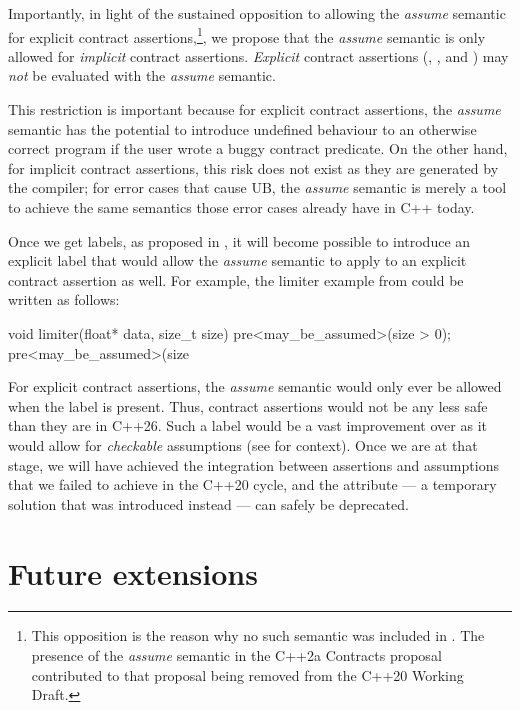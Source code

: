 Importantly, in light of the sustained opposition to allowing the \emph{assume} semantic for explicit contract assertions,\footnote{This opposition is the reason why  no such semantic was included in \cite{P2900R14}. The presence of the \emph{assume} semantic in the C++2a Contracts proposal \cite{P0542R5} contributed to that proposal being removed from the C++20 Working Draft.}, we propose that the \emph{assume} semantic is only allowed for \emph{implicit} contract assertions. \emph{Explicit} contract assertions (, , and ) may \emph{not} be evaluated with the \emph{assume} semantic.

This restriction is important because for explicit contract assertions, the \emph{assume} semantic  has the potential to introduce undefined behaviour to an otherwise correct program if the user wrote a buggy contract predicate. On the other hand, for implicit contract assertions, this risk does not exist as they are generated by the compiler; for error cases that cause UB, the \emph{assume} semantic is merely a tool to achieve the same semantics those error cases already have in C++ today.

Once we get labels, as proposed in \cite{P3400R1}, it will become possible to introduce an explicit label that would allow the \emph{assume} semantic to apply to an explicit contract assertion as well. For example, the limiter example from \cite{P1774R8} could be written as follows:
\begin{codeblock}
void limiter(float* data, size_t size)
  pre<may_be_assumed>(size > 0);
  pre<may_be_assumed>(size %
\end{codeblock}
For explicit contract assertions, the \emph{assume} semantic would only ever be allowed when the \mbox{} label is present. Thus, contract assertions would not be any less safe than they are in C++26. Such a label would be a vast improvement over \tcode{[[assume]]} as it would allow for \emph{checkable} assumptions (see \cite{P2064R0} for context). Once we are at that stage, we will have achieved the integration between assertions and assumptions that we failed to achieve in the C++20 cycle, and the \tcode{[[assume]]} attribute --- a temporary solution that was introduced instead --- can safely be deprecated.

\section{Future extensions}
\label{ext}

